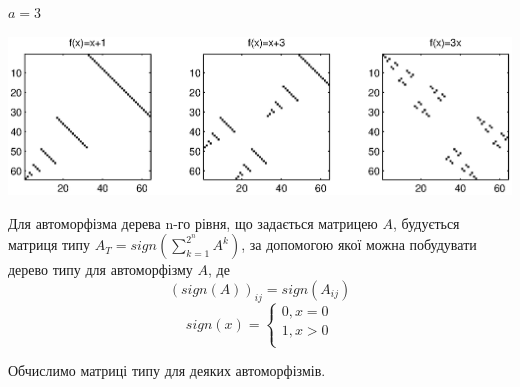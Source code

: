 \documentclass[a4paper,12pt]{article} \usepackage{a4wide}
\numberwithin{equation}{subsection}
\begin{document}
$a=3$
\begin{center}
\includegraphics[scale=0.8]{mat_3x.eps}
\end{center}
\bigskip
  Для автоморфізма дерева n-го рівня, що задається матрицею $A$,  будується матриця типу  $A_T=sign(\sum\limits_{k = 1}^{2^n } {A^k })$, за допомогою якої можна побудувати дерево типу для автоморфізму $A$, де $$(sign(A))_{ij}=sign(A_{ij})$$
\[
sign(x) = \left\{ \begin{array}{l}
 0,x = 0 \\
 1,x > 0 \\
 \end{array} \right.
\]


 Обчислимо матриці типу для деяких автоморфізмів.
\end{document}
